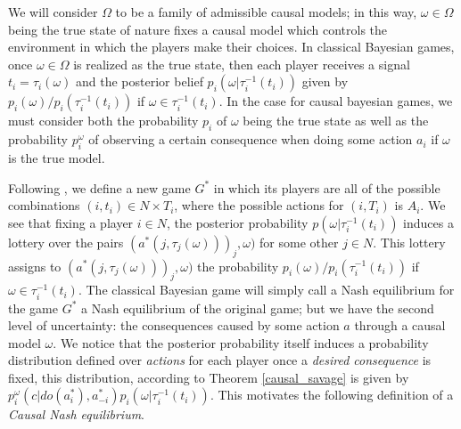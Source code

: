 \documentclass[review]{elsarticle}
\begin{document}
We will consider $\Omega$ to be a family of admissible causal models; in this way,  $\omega \in \Omega$ being the true state of nature fixes a causal model which controls the environment in which the players make their choices. In classical Bayesian games, once $\omega \in \Omega$ is realized as the true state, then each player receives a signal $t_i=\tau_i (\omega)$ and the posterior belief $p_i(\omega | \tau^{-1}_i (t_i) )$ given by $p_i(\omega) / p_i (\tau^{-1}_i (t_i))$ if $\omega \in \tau^{-1}_i (t_i)$. In the case for causal bayesian games, we must consider both the probability $p_i$ of $\omega$ being the true state as well as the probability $p^\omega_i$ of observing a certain consequence when doing some action $a_i$ if $\omega$ is the true model.

Following \cite{osborne1994course}, we define a new game $G^\ast$ in which its players are all of the possible combinations $(i, t_i) \in N \times T_i$, where the possible actions for $(i,T_i)$ is $A_i$. We see that fixing a player $i \in N$, the posterior probability $p(\omega | \tau^{-1}_i (t_i))$ induces a lottery over the pairs $(a^\ast(j,\tau_j(\omega)))_j,\omega)$ for some other $j \in N$. This lottery assigns to $(a^\ast(j,\tau_j(\omega)))_j,\omega)$ the probability $p_i(\omega) / p_i (\tau^{-1}_i (t_i))$ if $\omega \in \tau^{-1}_i (t_i)$. The classical Bayesian game will simply call a Nash equilibrium for the game $G^\ast$ a Nash equilibrium of the original game; but we have the second level of uncertainty: the consequences caused by some action $a$ through a causal model $\omega$. We notice that the posterior probability itself induces a probability distribution defined over \textit{actions} for each player once a \textit{desired consequence} is fixed, this distribution, according to Theorem \ref{causal_savage} is given by $p^\omega_i (c | do(a^\ast_i), a^\ast_{-i}) p_i(\omega | \tau^{-1}_i (t_i))$. This motivates the following definition of a \textit{Causal Nash equilibrium}.
\end{document}
